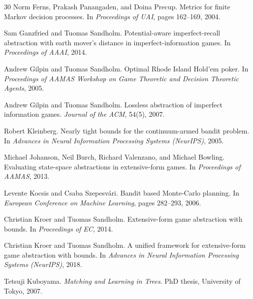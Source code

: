 \documentclass[11pt]{article}
\begin{document}
\begin{thebibliography}{30}
Norm Ferns, Prakash Panangaden, and Doina Precup.
\newblock Metrics for finite {Markov} decision processes.
\newblock In \emph{Proceedings of UAI}, pages 162--169, 2004.

Sam Ganzfried and Tuomas Sandholm.
\newblock Potential-aware imperfect-recall abstraction with earth mover's
  distance in imperfect-information games.
\newblock In \emph{Proceedings of AAAI}, 2014.

Andrew Gilpin and Tuomas Sandholm.
\newblock Optimal {Rhode Island Hold'em} poker.
\newblock In \emph{Proceedings of AAMAS Workshop on Game Theoretic and Decision
  Theoretic Agents}, 2005.

Andrew Gilpin and Tuomas Sandholm.
\newblock Lossless abstraction of imperfect information games.
\newblock \emph{Journal of the ACM}, 54(5), 2007.

Robert Kleinberg.
\newblock Nearly tight bounds for the continuum-armed bandit problem.
\newblock In \emph{Advances in Neural Information Processing Systems (NeurIPS)},
  2005.

Michael Johanson, Neil Burch, Richard Valenzano, and Michael Bowling.
\newblock Evaluating state-space abstractions in extensive-form games.
\newblock In \emph{Proceedings of AAMAS}, 2013.

Levente Kocsis and Csaba Szepesv{\'a}ri.
\newblock Bandit based {Monte-Carlo} planning.
\newblock In \emph{European Conference on Machine Learning}, pages 282--293,
  2006.

Christian Kroer and Tuomas Sandholm.
\newblock Extensive-form game abstraction with bounds.
\newblock In \emph{Proceedings of EC}, 2014.

Christian Kroer and Tuomas Sandholm.
\newblock A unified framework for extensive-form game abstraction with bounds.
\newblock In \emph{Advances in Neural Information Processing Systems (NeurIPS)},
  2018.

Tetsuji Kuboyama.
\newblock \emph{Matching and Learning in Trees}.
\newblock PhD thesis, University of Tokyo, 2007.


\end{thebibliography}
\end{document}
